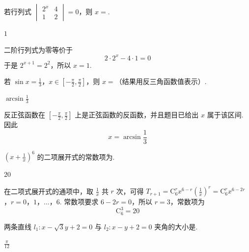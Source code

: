 \begin{problem}
若行列式 \( \begin{vmatrix}2^{x}&4\\1&2\end{vmatrix}=0 \)，则 \(x=\)\fillinblank{}.
\end{problem}

\begin{answer}
\(1\)
\end{answer}

\begin{solution}
二阶行列式为零等价于
\[
2\cdot2^x-4\cdot1=0
\]
于是 \(2^{x+1}=2^2\)，所以 \(x=1\).
\end{solution}

\begin{problem}
若 \(\sin x = \frac{1}{3}\)，\(x \in \left[-\frac{\pi}{2}, \frac{\pi}{2}\right]\)，则 \( x = \)\fillinblank{}（结果用反三角函数值表示）.
\end{problem}

\begin{answer}
\(\arcsin\frac{1}{3}\)
\end{answer}

\begin{solution}
反正弦函数在 \(\left[-\frac{\pi}{2},\frac{\pi}{2}\right]\) 上是正弦函数的反函数，并且题目已给出 \(x\) 属于该区间. 因此
\[
x=\arcsin\frac{1}{3}
\]
\end{solution}

\begin{problem}
\(\left(x + \frac{1}{x}\right)^6\) 的二项展开式的常数项为\fillinblank{}.
\end{problem}

\begin{answer}
\(20\)
\end{answer}

\begin{solution}
在二项式展开式的通项中，取 \(\frac{1}{x}\) 共 \(r\) 次，可得
\(T_{r+1}=\mathrm C_6^r x^{6-r}\left(\frac{1}{x}\right)^r =\mathrm C_6^r x^{6-2r}\)，\(r=0\)，\(1\)，\(\ldots\)，\(6\).
常数项要求 \(6-2r=0\)，所以 \(r=3\)，常数项为
\[
\mathrm C_6^3=20
\]
\end{solution}

\begin{problem}
两条直线 \(l_1: x - \sqrt{3} y + 2 = 0\) 与 \(l_2: x - y + 2 = 0\) 夹角的大小是\fillinblank{}.
\end{problem}

\begin{answer}
\(\frac{\pi}{12}\)
\end{answer}

